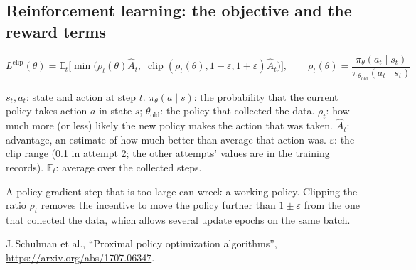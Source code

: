 \subsection{Reinforcement learning: the objective and the reward terms}
\[L^{\text{clip}}(\theta)=\mathbb E_t\Big[\min\big(\rho_t(\theta)\hat A_t,\;\operatorname{clip}(\rho_t(\theta),1-\varepsilon,1+\varepsilon)\hat A_t\big)\Big],\qquad \rho_t(\theta)=\frac{\pi_\theta(a_t\mid s_t)}{\pi_{\theta_{\text{old}}}(a_t\mid s_t)}\]
\begin{description}[leftmargin=2.6cm,style=nextline]
\item[Symbols] $s_t,a_t$: state and action at step $t$. $\pi_\theta(a\mid s)$: the probability that the current policy takes action $a$ in state $s$; $\theta_{\text{old}}$: the policy that collected the data. $\rho_t$: how much more (or less) likely the new policy makes the action that was taken. $\hat A_t$: advantage, an estimate of how much better than average that action was. $\varepsilon$: the clip range (0.1 in attempt 2; the other attempts' values are in the training records). $\mathbb E_t$: average over the collected steps.
\item[Why] A policy gradient step that is too large can wreck a working policy. Clipping the ratio $\rho_t$ removes the incentive to move the policy further than $1\pm\varepsilon$ from the one that collected the data, which allows several update epochs on the same batch.
\item[Source] J.\,Schulman et al., ``Proximal policy optimization algorithms'', \url{https://arxiv.org/abs/1707.06347}.
\end{description}

